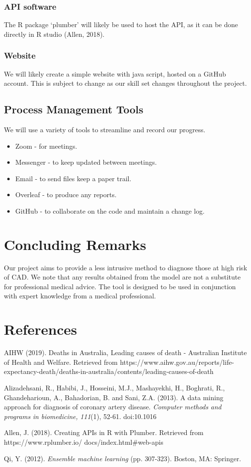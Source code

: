 \documentclass[a4paper, 12pt]{article}
\begin{document}
\subsubsection{API software}
The R package `plumber' will likely be used to host the API, as it can be done directly in R studio (Allen, 2018).

\subsubsection{Website}
We will likely create a simple website with java script, hosted on a GitHub account. This is subject to change as our skill set changes throughout the project.

\subsection{Process Management Tools}
We will use a variety of tools to streamline and record our progress.
\begin{itemize}
    \item Zoom - for meetings.
    \item Messenger - to keep updated between meetings.
    \item Email - to send files keep a paper trail. 
    \item Overleaf - to produce any reports.
    \item GitHub - to collaborate on the code and maintain a change log.
\end{itemize}

\section{Concluding Remarks}
Our project aims to provide a less intrusive method to diagnose those at high risk of CAD. We  note that any results obtained from the model are not a substitute for professional medical advice. The tool is designed to be used in conjunction with expert knowledge from a medical professional.

\section{References}
\begin{hangparas}{0.7cm}{1}
AIHW (2019). Deaths in Australia, Leading causes of death - Australian Institute of Health and Welfare. Retrieved from https://www.aihw.gov.au/reports/life-expectancy-death/deaths-in-australia/contents/leading-causes-of-death

Alizadehsani, R., Habibi, J., Hosseini, M.J., Mashayekhi, H., Boghrati, R., Ghandeharioun, A., Bahadorian, B. and Sani, Z.A. (2013). A data mining approach for diagnosis of coronary artery disease. \textit{Computer methods and programs in biomedicine, 111}(1), 52-61. doi:10.1016

Allen, J. (2018). Creating APIs in R with Plumber. Retrieved from https://www.rplumber.io/
docs/index.html#web-apis

Qi, Y. (2012). \textit{Ensemble machine learning} (pp. 307-323). Boston, MA: Springer.
\end{hangparas}
\end{document}
